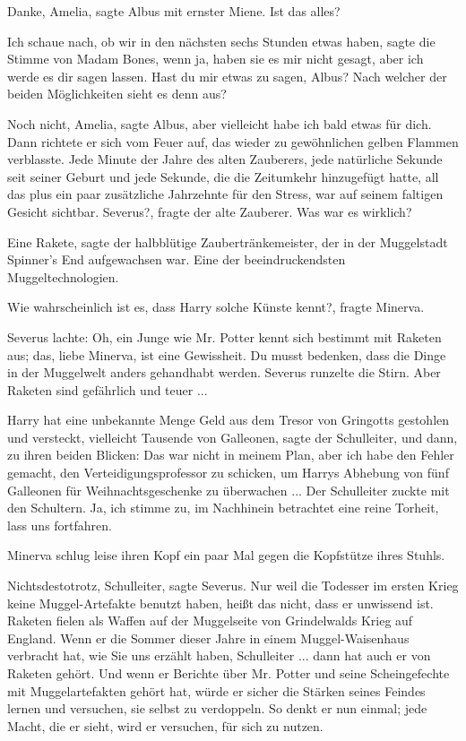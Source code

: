 \glqq{}Danke, Amelia\grqq{}, sagte Albus mit ernster Miene. \glqq{}Ist das
alles?\grqq{}

\glqq{}Ich schaue nach, ob wir in den nächsten sechs Stunden etwas haben\grqq{},
sagte die Stimme von Madam Bones, \glqq{}wenn ja, haben sie es mir nicht gesagt,
aber ich werde es dir sagen lassen. Hast du mir etwas zu sagen, Albus? Nach
welcher der beiden Möglichkeiten sieht es denn aus?\grqq{}

\glqq{}Noch nicht, Amelia\grqq{}, sagte Albus, \glqq{}aber vielleicht habe ich
bald etwas für dich.\grqq{} Dann richtete er sich vom Feuer auf, das wieder zu
gewöhnlichen gelben Flammen verblasste. Jede Minute der Jahre des alten
Zauberers, jede natürliche Sekunde seit seiner Geburt und jede Sekunde, die die
Zeitumkehr hinzugefügt hatte, all das plus ein paar zusätzliche Jahrzehnte für
den Stress, war auf seinem faltigen Gesicht sichtbar. \glqq{}Severus?\grqq{},
fragte der alte Zauberer. \glqq{}Was war es wirklich?\grqq{}

\glqq{}Eine Rakete\grqq{}, sagte der halbblütige Zaubertränkemeister, der in der
Muggelstadt Spinner's End aufgewachsen war. \glqq{}Eine der beeindruckendsten
Muggeltechnologien.\grqq{}

\glqq{}Wie wahrscheinlich ist es, dass Harry solche Künste kennt?\grqq{}, fragte
Minerva.

Severus lachte: \glqq{}Oh, ein Junge wie Mr. Potter kennt sich bestimmt mit
Raketen aus; das, liebe Minerva, ist eine Gewissheit. Du musst bedenken, dass
die Dinge in der Muggelwelt anders gehandhabt werden.\grqq{} Severus runzelte
die Stirn. \glqq{}Aber Raketen sind gefährlich und teuer ...\grqq{}

\glqq{}Harry hat eine unbekannte Menge Geld aus dem Tresor von Gringotts
gestohlen und versteckt, vielleicht Tausende von Galleonen\grqq{}, sagte der
Schulleiter, und dann, zu ihren beiden Blicken: \glqq{}Das war nicht in meinem
Plan, aber ich habe den Fehler gemacht, den Verteidigungsprofessor zu schicken,
um Harrys Abhebung von fünf Galleonen für Weihnachtsgeschenke zu überwachen ...\grqq{}
Der Schulleiter zuckte mit den Schultern. \glqq{}Ja, ich stimme zu, im Nachhinein
betrachtet eine reine Torheit, lass uns fortfahren.\grqq{}

Minerva schlug leise ihren Kopf ein paar Mal gegen die Kopfstütze ihres Stuhls.

\glqq{}Nichtsdestotrotz, Schulleiter\grqq{}, sagte Severus. \glqq{}Nur weil die
Todesser im ersten Krieg keine Muggel-Artefakte benutzt haben, heißt das nicht,
dass er unwissend ist. Raketen fielen als Waffen auf der Muggelseite von
Grindelwalds Krieg auf England. Wenn er die Sommer dieser Jahre in einem
Muggel-Waisenhaus verbracht hat, wie Sie uns erzählt haben, Schulleiter ... dann
hat auch er von Raketen gehört. Und wenn er Berichte über Mr. Potter und seine
Scheingefechte mit Muggelartefakten gehört hat, würde er sicher die Stärken
seines Feindes lernen und versuchen, sie selbst zu verdoppeln. So denkt er nun
einmal; jede Macht, die er sieht, wird er versuchen, für sich zu nutzen.\grqq{}

